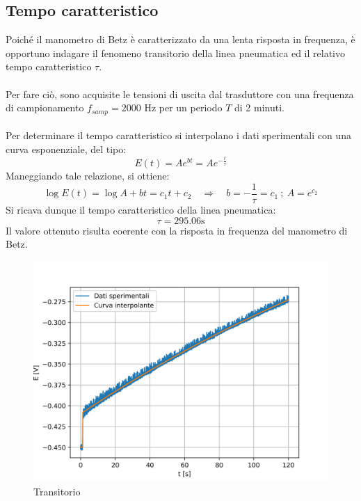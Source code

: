 \newpage
\subsection{Tempo caratteristico}
Poiché il manometro di Betz è caratterizzato da una lenta risposta in frequenza, è opportuno indagare il fenomeno transitorio della linea pneumatica ed il relativo tempo caratteristico $\tau$.\\\\
Per fare ciò, sono acquisite le tensioni di uscita dal trasduttore con una frequenza di campionamento $f_{samp}=2000$ Hz per un periodo $T$ di 2 minuti.\\\\
Per determinare il tempo caratteristico si interpolano i dati sperimentali con una curva esponenziale, del tipo:
\begin{equation*}
    E(t) = Ae^{bt} = Ae^{-\frac t\tau}
\end{equation*}
Maneggiando tale relazione, si ottiene:
\begin{equation*}
    \log E(t) = \log A + bt = c_1 t + c_2 \quad \Rightarrow \quad b = -\frac1\tau = c_1 \ ; \ A = e^{c_2}
\end{equation*}
Si ricava dunque il tempo caratteristico della linea pneumatica:
\begin{equation*}
    \tau = 295.06 \text{s}
\end{equation*}
Il valore ottenuto risulta coerente con la risposta in frequenza del manometro di Betz.
\begin{figure}[h!]
    \centering
    \includegraphics[width=.8\textwidth]{images/1/transitorio.png}
    \caption{Transitorio}\label{fig:t1}
\end{figure}